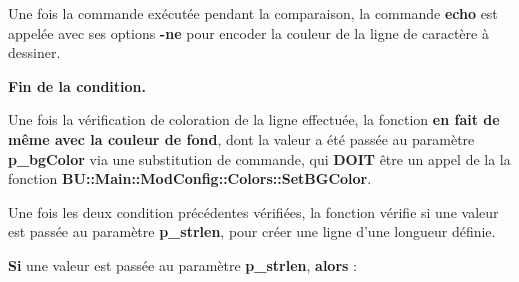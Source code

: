 \documentclass[a4paper,10pt]{article}
\begin{document}
\begin{justify}
    Une fois la commande exécutée pendant la comparaison, la commande \textbf{\color{gray}echo} est appelée avec ses options \textbf{\color{gray}-ne} pour encoder la couleur de la ligne de caractère à dessiner.
\end{justify}

\begin{justify}
    \textbf{\color{brick}Fin de la condition.}
\end{justify}\setlength{\parskip}{2em}


\begin{justify}
    Une fois la vérification de coloration de la ligne effectuée, la fonction \textbf{\color{brick}en fait de même avec la couleur de fond}, dont la valeur a été passée au paramètre \textbf{\color{orange}p\_bgColor} via une substitution de commande, qui \textbf{DOIT} être un appel de la la fonction \textbf{\color{mauve}BU::Main::ModConfig::Colors::SetBGColor}.
\end{justify}\setlength{\parskip}{1em}

\begin{justify}
    Une fois les deux condition précédentes vérifiées, la fonction vérifie si une valeur est passée au paramètre \textbf{\color{orange}p\_strlen}, pour créer une ligne d'une longueur définie.
\end{justify}\setlength{\parskip}{2em}

\begin{justify}
    \textbf{\color{brick}Si} une valeur est passée au paramètre \textbf{\color{orange}p\_strlen}, \textbf{\color{brick}alors} :\par
\end{justify}\setlength{\parskip}{1em}
\end{document}
